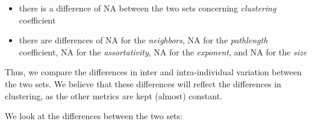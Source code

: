 \documentclass[
]{article}
\providecommand{\tightlist}{%
  \setlength{\itemsep}{0pt}\setlength{\parskip}{0pt}}
\begin{document}
\begin{itemize}
\tightlist
\item
  there is a difference of NA between the two sets concerning
  \emph{clustering} coefficient
\item
  there are differences of NA for the \emph{neighbors}, NA for the
  \emph{pathlength} coefficient, NA for the \emph{assortativity}, NA for
  the \emph{exponent}, and NA for the \emph{size}
\end{itemize}

Thus, we compare the differences in inter and intra-individual variation
between the two sets. We believe that these differences will reflect the
differences in clustering, as the other metrics are kept (almost)
constant.

We look at the differences between the two sets:
\end{document}
